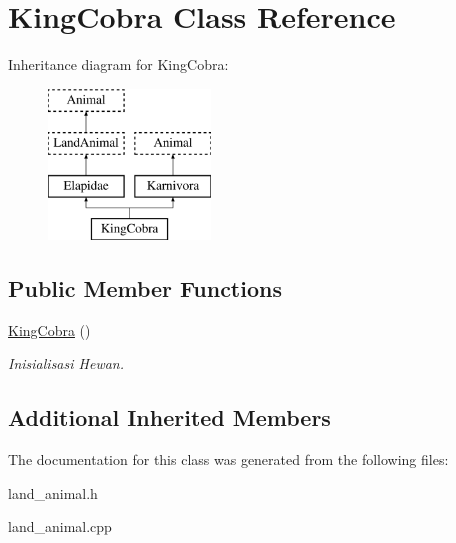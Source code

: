 \hypertarget{class_king_cobra}{}\section{King\+Cobra Class Reference}
\label{class_king_cobra}
Inheritance diagram for King\+Cobra\+:\begin{figure}[H]
\begin{center}
\leavevmode
\includegraphics[height=4.000000cm]{class_king_cobra}
\end{center}
\end{figure}
\subsection*{Public Member Functions}
\begin{DoxyCompactItemize}
\item 
\hyperlink{class_king_cobra_a6f89802b7497ecd80d3084b0c1fa7f95}{King\+Cobra} ()\hypertarget{class_king_cobra_a6f89802b7497ecd80d3084b0c1fa7f95}{}\label{class_king_cobra_a6f89802b7497ecd80d3084b0c1fa7f95}

\begin{DoxyCompactList}\small\item\em Inisialisasi Hewan. \end{DoxyCompactList}\end{DoxyCompactItemize}
\subsection*{Additional Inherited Members}


The documentation for this class was generated from the following files\+:\begin{DoxyCompactItemize}
\item 
land\+\_\+animal.\+h\item 
land\+\_\+animal.\+cpp\end{DoxyCompactItemize}

